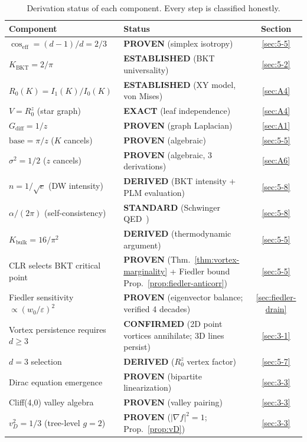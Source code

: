 \documentclass[aps,prd,onecolumn,superscriptaddress,floatfix,12pt]{revtex4-2}
\newcommand{\Rzero}{R_0}
\newcommand{\Kbulk}{K_{\text{bulk}}}
\newcommand{\KBKT}{K_{\text{BKT}}}
\newcommand{\coseff}{\cos_{\text{eff}}}
\newcommand{\Gdiff}{G_{\text{diff}}}
\begin{document}
\begin{table}[t]
\caption{Derivation status of each component. Every step is classified honestly.}
\label{tab:proof-status}
\begin{tabular}{llc}
\toprule
Component & Status & Section \\
\midrule
$\coseff = (d{-}1)/d = 2/3$ & \textbf{PROVEN} (simplex isotropy) & \ref{sec:5-5} \\
$\KBKT = 2/\pi$ & \textbf{ESTABLISHED} (BKT universality) & \ref{sec:5-2} \\
$\Rzero(K) = I_1(K)/I_0(K)$ & \textbf{ESTABLISHED} (XY model, von Mises) & \ref{sec:A4} \\
$V = \Rzero^z$ (star graph) & \textbf{EXACT} (leaf independence) & \ref{sec:A4} \\
$\Gdiff = 1/z$ & \textbf{PROVEN} (graph Laplacian) & \ref{sec:A1} \\
$\text{base} = \pi/z$ ($K$ cancels) & \textbf{PROVEN} (algebraic) & \ref{sec:5-5} \\
$\sigma^2 = 1/2$ ($z$ cancels) & \textbf{PROVEN} (algebraic, 3 derivations) & \ref{sec:A6} \\
$n = 1/\sqrt{e}$ (DW intensity) & \textbf{DERIVED} (BKT intensity + PLM evaluation) & \ref{sec:5-8} \\
$\alpha/(2\pi)$ (self-consistency) & \textbf{STANDARD} (Schwinger QED~\cite{Schwinger1948}) & \ref{sec:5-8} \\
$\Kbulk = 16/\pi^2$ & \textbf{DERIVED} (thermodynamic argument) & \ref{sec:5-5} \\
CLR selects BKT critical point & \textbf{PROVEN} (Thm.~\ref{thm:vortex-marginality} + Fiedler bound Prop.~\ref{prop:fiedler-anticorr}) & \ref{sec:5-5} \\
Fiedler sensitivity $\propto (w_0/\varepsilon)^2$ & \textbf{PROVEN} (eigenvector balance; verified 4 decades) & \ref{sec:fiedler-drain} \\
Vortex persistence requires $d \geq 3$ & \textbf{CONFIRMED} (2D point vortices annihilate; 3D lines persist) & \ref{sec:3-1} \\
$d = 3$ selection & \textbf{DERIVED} ($\Rzero^z$ vertex factor) & \ref{sec:5-7} \\
Dirac equation emergence & \textbf{PROVEN} (bipartite linearization) & \ref{sec:3-3} \\
Cliff(4,0) valley algebra & \textbf{PROVEN} (valley pairing) & \ref{sec:3-3} \\
$v_D^2 = 1/3$ (tree-level $g = 2$) & \textbf{PROVEN} ($|\nabla f|^2 = 1$; Prop.~\ref{prop:vD}) & \ref{sec:3-3} \\

\end{tabular}
\end{table}
\end{document}
